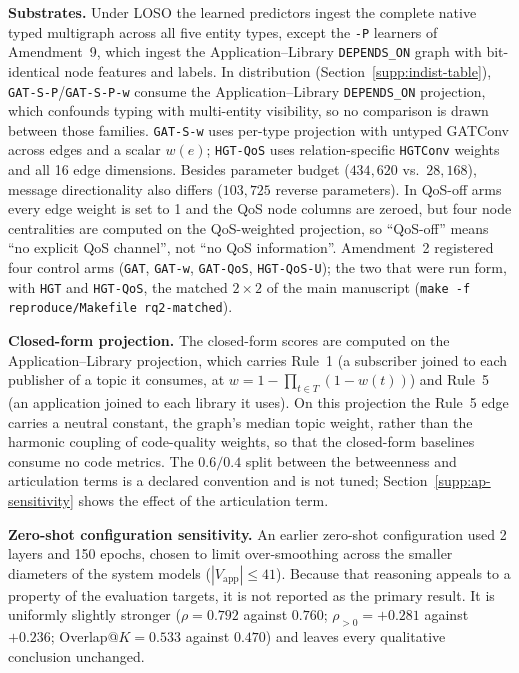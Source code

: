 \documentclass[preprint,3p]{elsarticle}
\begin{document}
\noindent\textbf{Substrates.} Under LOSO the learned predictors ingest the complete native typed multigraph across all five entity types, except the \texttt{-P} learners of Amendment~9, which ingest the Application--Library \texttt{DEPENDS\_ON} graph with bit-identical node features and labels. In distribution (Section~\ref{supp:indist-table}), \texttt{GAT-S-P}/\texttt{GAT-S-P-w} consume the Application--Library \texttt{DEPENDS\_ON} projection, which confounds typing with multi-entity visibility, so no comparison is drawn between those families. \texttt{GAT-S-w} uses per-type projection with untyped GATConv across edges and a scalar $w(e)$; \texttt{HGT-QoS} uses relation-specific \texttt{HGTConv} weights and all 16 edge dimensions. Besides parameter budget ($434{,}620$ vs.\ $28{,}168$), message directionality also differs ($103{,}725$ reverse parameters). In QoS-off arms every edge weight is set to 1 and the QoS node columns are zeroed, but four node centralities are computed on the QoS-weighted projection, so ``QoS-off'' means ``no explicit QoS channel'', not ``no QoS information''. Amendment~2 registered four control arms (\texttt{GAT}, \texttt{GAT-w}, \texttt{GAT-QoS}, \texttt{HGT-QoS-U}); the two that were run form, with \texttt{HGT} and \texttt{HGT-QoS}, the matched $2\times2$ of the main manuscript (\texttt{make -f reproduce/Makefile rq2-matched}).

\noindent\textbf{Closed-form projection.} The closed-form scores are computed on the Application--Library projection, which carries Rule~1 (a subscriber joined to each publisher of a topic it consumes, at $w = 1 - \prod_{t \in T}(1 - w(t))$) and Rule~5 (an application joined to each library it uses). On this projection the Rule~5 edge carries a neutral constant, the graph's median topic weight, rather than the harmonic coupling of code-quality weights, so that the closed-form baselines consume no code metrics. The $0.6/0.4$ split between the betweenness and articulation terms is a declared convention and is not tuned; Section~\ref{supp:ap-sensitivity} shows the effect of the articulation term.

\noindent\textbf{Zero-shot configuration sensitivity.} An earlier zero-shot configuration used 2 layers and 150 epochs, chosen to limit over-smoothing across the smaller diameters of the system models ($|V_{\text{app}}| \le 41$). Because that reasoning appeals to a property of the evaluation targets, it is not reported as the primary result. It is uniformly slightly stronger ($\rho = 0.792$ against $0.760$; $\rho_{>0} = +0.281$ against $+0.236$; Overlap@$K = 0.533$ against $0.470$) and leaves every qualitative conclusion unchanged.
\end{document}
